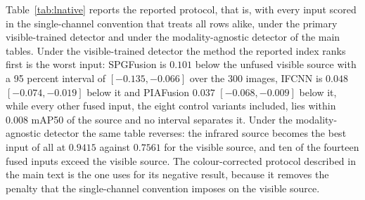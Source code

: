 \documentclass[10pt,a4paper]{article}
\begin{document}
Table~\ref{tab:lnative} reports the reported protocol, that is, with every input scored
in the single-channel convention that treats all rows alike, under the primary
visible-trained detector and under the modality-agnostic detector of the main tables.
Under the visible-trained detector the method the reported index ranks first is the
worst input: SPGFusion is $0.101$ below the unfused visible source with a 95 percent
interval of $[-0.135,-0.066]$ over the 300 images, IFCNN is $0.048$
$[-0.074,-0.019]$ below it and PIAFusion $0.037$ $[-0.068,-0.009]$ below it, while
every other fused input, the eight control variants included, lies within $0.008$
mAP50 of the source and no interval separates it. Under the modality-agnostic detector
the same table reverses: the infrared source becomes the best input of all at $0.9415$
against $0.7561$ for the visible source, and ten of the fourteen fused inputs exceed
the visible source. The colour-corrected protocol described in the main text is the one
uses for its negative result, because it removes the penalty that the single-channel
convention imposes on the visible source.
\end{document}
